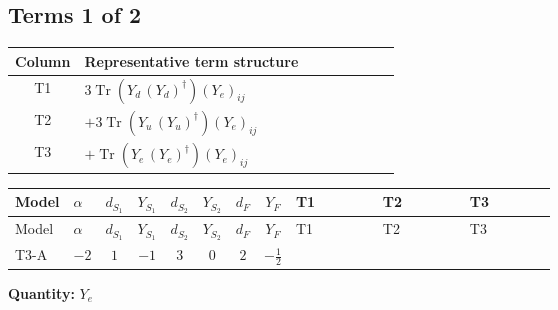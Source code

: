 \documentclass[8pt]{article}
\begin{document}
\begin{landscape}
\subsection*{Terms 1 of 2}
\begin{center}
\begin{tabular}{@{}c >{\raggedright\arraybackslash}p{0.82\linewidth}@{}}
\toprule
Column & Representative term structure \\
\midrule
T1 & \(\displaystyle 3 \operatorname{Tr}\!\left({Y_d}\,\left({Y_d}\right)^{\dagger}\right) \left({Y_e}\right)_{ij}\) \\
\midrule
T2 & \(\displaystyle +3 \operatorname{Tr}\!\left({Y_u}\,\left({Y_u}\right)^{\dagger}\right) \left({Y_e}\right)_{ij}\) \\
\midrule
T3 & \(\displaystyle +\operatorname{Tr}\!\left({Y_e}\,\left({Y_e}\right)^{\dagger}\right) \left({Y_e}\right)_{ij}\) \\
\midrule
\bottomrule
\end{tabular}
\end{center}
\smallskip
\tiny
\begin{longtable}{@{}llcccccc >{\raggedright\arraybackslash}p{0.21\linewidth} >{\raggedright\arraybackslash}p{0.21\linewidth} >{\raggedright\arraybackslash}p{0.21\linewidth}@{}}
\toprule
Model & $\alpha$ & $d_{S_1}$ & $Y_{S_1}$ & $d_{S_2}$ & $Y_{S_2}$ & $d_F$ & $Y_F$ & T1 & T2 & T3 \\
\midrule
\endfirsthead
\toprule
Model & $\alpha$ & $d_{S_1}$ & $Y_{S_1}$ & $d_{S_2}$ & $Y_{S_2}$ & $d_F$ & $Y_F$ & T1 & T2 & T3 \\
\midrule
\endhead
T3-A & $-2$ & $1$ & $-1$ & $3$ & $0$ & $2$ & $-\frac{1}{2}$ & \scriptsize\adjustbox{max width=\linewidth}{$\begin{gathered} 3 \operatorname{Tr}\!\left({Y_d}\,\left({Y_d}\right)^{\dagger}\right) \left({Y_e}\right)_{ij}\end{gathered}$} & \scriptsize\adjustbox{max width=\linewidth}{$\begin{gathered} +3 \operatorname{Tr}\!\left({Y_u}\,\left({Y_u}\right)^{\dagger}\right) \left({Y_e}\right)_{ij}\end{gathered}$} & \scriptsize\adjustbox{max width=\linewidth}{$\begin{gathered} +\operatorname{Tr}\!\left({Y_e}\,\left({Y_e}\right)^{\dagger}\right) \left({Y_e}\right)_{ij}\end{gathered}$} \\
\midrule
\bottomrule
\end{longtable}
\clearpage
\noindent\textbf{Quantity: }$Y_e$\par\smallskip

\end{landscape}
\end{document}
